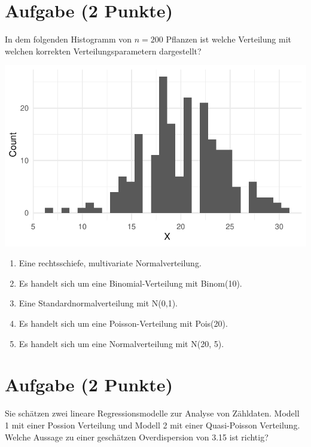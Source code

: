 \documentclass[a4paper, 10pt]{scrartcl}\usepackage[]{graphicx}\usepackage[]{xcolor}
\makeatletter
\def\maxwidth{ %
  \ifdim\Gin@nat@width>\linewidth
    \linewidth
  \else
    \Gin@nat@width
  \fi
}
\makeatother
\begin{document}
\section{Aufgabe \hfill (2 Punkte)}

In dem folgenden Histogramm von $n = 200$ Pflanzen ist welche Verteilung
mit welchen korrekten Verteilungsparametern dargestellt?



{\centering \includegraphics[width=\maxwidth]{img/mc-distribution-02-a-1} 

}







\begin{enumerate}
\item [\textbf{A} \msquare] Eine rechtsschiefe, multivariate Normalverteilung.
\item [\textbf{B} \msquare] Es handelt sich um eine Binomial-Verteilung mit Binom(10).
\item [\textbf{C} \msquare] Eine Standardnormalverteilung mit N(0,1).
\item [\textbf{D} \msquare] Es handelt sich um eine Poisson-Verteilung mit Pois(20).
\item [\textbf{E} \msquare] Es handelt sich um eine Normalverteilung mit N(20, 5).
\end{enumerate} 

\section{Aufgabe \hfill (2 Punkte)}



Sie sch{\"a}tzen zwei lineare Regressionsmodelle zur Analyse von
Z{\"a}hldaten. Modell 1 mit einer Possion Verteilung und Modell 2 mit einer
Quasi-Poisson Verteilung. Welche Aussage zu einer gesch{\"a}tzen Overdispersion
von 3.15 ist richtig?
\end{document}
